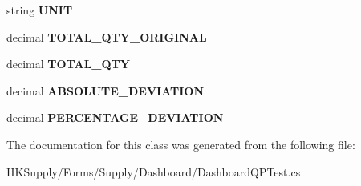 \begin{DoxyCompactItemize}
\item 
\mbox{\label{class_h_k_supply_1_1_forms_1_1_supply_1_1_dashboard_1_1_aux_dashboard_q_p_stored_af6fdf98e6dac89af309a0d39c3ed1466}} 
string {\bfseries U\+N\+IT}
\item 
\mbox{\label{class_h_k_supply_1_1_forms_1_1_supply_1_1_dashboard_1_1_aux_dashboard_q_p_stored_abdb92307aae810d8c03eb37bc2b0c3c6}} 
decimal {\bfseries T\+O\+T\+A\+L\+\_\+\+Q\+T\+Y\+\_\+\+O\+R\+I\+G\+I\+N\+AL}
\item 
\mbox{\label{class_h_k_supply_1_1_forms_1_1_supply_1_1_dashboard_1_1_aux_dashboard_q_p_stored_a75db5deab48bfc57b32aadd97f7ccb19}} 
decimal {\bfseries T\+O\+T\+A\+L\+\_\+\+Q\+TY}
\item 
\mbox{\label{class_h_k_supply_1_1_forms_1_1_supply_1_1_dashboard_1_1_aux_dashboard_q_p_stored_a4066201bc9ed8d98b9c59093d930dde1}} 
decimal {\bfseries A\+B\+S\+O\+L\+U\+T\+E\+\_\+\+D\+E\+V\+I\+A\+T\+I\+ON}
\item 
\mbox{\label{class_h_k_supply_1_1_forms_1_1_supply_1_1_dashboard_1_1_aux_dashboard_q_p_stored_ab967cbfe2a3eea7e71883b410069e50c}} 
decimal {\bfseries P\+E\+R\+C\+E\+N\+T\+A\+G\+E\+\_\+\+D\+E\+V\+I\+A\+T\+I\+ON}
\end{DoxyCompactItemize}


The documentation for this class was generated from the following file\+:\begin{DoxyCompactItemize}
\item 
H\+K\+Supply/\+Forms/\+Supply/\+Dashboard/Dashboard\+Q\+P\+Test.\+cs\end{DoxyCompactItemize}
